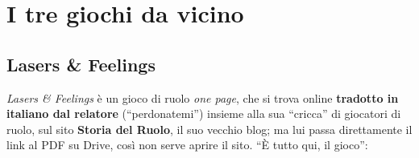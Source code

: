 \section{I tre giochi da vicino}
\label{z7:sec:tre-giochi}

\subsection{Lasers \& Feelings}
\label{z7:subsec:lasers-feelings}

\emph{Lasers \& Feelings} è un gioco di ruolo \emph{one page}, che si trova
online \textbf{tradotto in italiano dal relatore} (``perdonatemi'') insieme alla
sua ``cricca'' di giocatori di ruolo, sul sito \textbf{Storia del Ruolo}, il suo
vecchio blog; ma lui passa direttamente il link al PDF su Drive, così non serve
aprire il sito. ``È tutto qui, il gioco'':
